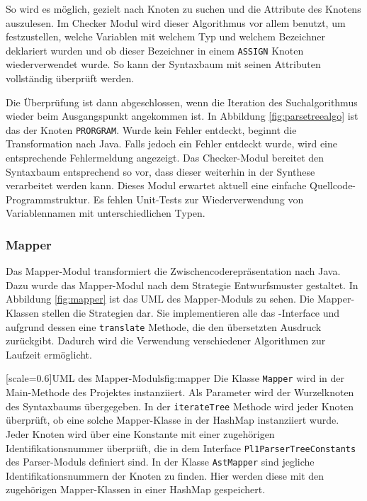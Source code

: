 So wird es möglich, gezielt nach Knoten zu suchen und die Attribute des Knotens auszulesen.
Im Checker Modul wird dieser Algorithmus vor allem benutzt, um festzustellen, welche Variablen mit welchem Typ und welchem Bezeichner deklariert wurden und ob dieser Bezeichner in einem \verb+ASSIGN+ Knoten wiederverwendet wurde. So kann der Syntaxbaum mit seinen Attributen vollständig überprüft werden.

Die Überprüfung ist dann abgeschlossen, wenn die Iteration des Suchalgorithmus wieder beim Ausgangspunkt angekommen ist. In Abbildung \ref{fig:parsetreealgo} ist das der Knoten \verb+PRORGRAM+. Wurde kein Fehler entdeckt, beginnt die Transformation nach Java. Falls jedoch ein Fehler entdeckt wurde, wird eine entsprechende Fehlermeldung angezeigt. Das Checker-Modul bereitet den Syntaxbaum entsprechend so vor, dass dieser weiterhin in der Synthese verarbeitet werden kann. Dieses Modul erwartet aktuell eine einfache Quellcode-Programmstruktur. Es fehlen Unit-Tests zur Wiederverwendung von Variablennamen mit unterschiedlichen Typen.

\subsubsection{Mapper}
Das Mapper-Modul transformiert die Zwischencoderepräsentation nach Java. Dazu wurde das Mapper-Modul nach dem Strategie Entwurfsmuster gestaltet.
In Abbildung \ref{fig:mapper} ist das UML des Mapper-Moduls zu sehen. 
Die Mapper-Klassen stellen die Strategien dar. Sie implementieren alle das -Interface und aufgrund dessen eine \verb+translate+ Methode, die den übersetzten Ausdruck zurückgibt. Dadurch wird die Verwendung verschiedener Algorithmen zur Laufzeit ermöglicht. 

[scale=0.6]{UML des Mapper-Moduls}{fig:mapper}
\pagebreak
Die Klasse \verb+Mapper+ wird in der Main-Methode des Projektes instanziiert. Als Parameter wird der Wurzelknoten des Syntaxbaums übergegeben.
In der \verb+iterateTree+ Methode wird jeder Knoten überprüft, ob eine solche Mapper-Klasse in der HashMap instanziiert wurde.
Jeder Knoten wird über eine Konstante mit einer zugehörigen Identifikationsnummer überprüft, die in dem Interface \verb+Pl1ParserTreeConstants+ des Parser-Moduls definiert sind. 
In der Klasse \verb+AstMapper+ sind jegliche Identifikationsnummern der Knoten zu finden. Hier werden diese mit den zugehörigen Mapper-Klassen in einer HashMap gespeichert.

